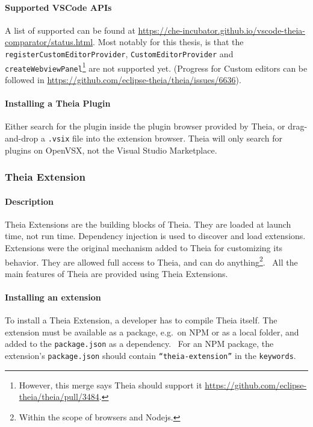 \paragraph*{Supported VSCode APIs}
A list of supported  can be found at \href{https://che-incubator.github.io/vscode-theia-comparator/status.html}{https://che-incubator.github.io/vscode-theia-comparator/status.html}.
Most notably for this thesis, is that the \texttt{registerCustomEditorProvider}, \texttt{CustomEditorProvider} and \texttt{createWebviewPanel}\footnote{However, this merge says Theia should support it \href{https://github.com/eclipse-theia/theia/pull/3484}{https://github.com/eclipse-theia/theia/pull/3484}.} are not supported yet.
(Progress for Custom editors can be followed in \href{https://github.com/eclipse-theia/theia/issues/6636}{https://github.com/eclipse-theia/theia/issues/6636}).

\paragraph*{Installing a Theia Plugin}
Either search for the plugin inside the plugin browser provided by \gls{Theia},
or drag-and-drop a \texttt{.vsix} file into the extension browser.
Theia will only search for plugins on OpenVSX, not the Visual Studio Marketplace.



\subsubsection{Theia Extension}

\paragraph*{Description}
\Gls{Theia} Extensions are the building blocks of Theia.
They are loaded at launch time, not run time.
Dependency injection is used to discover and load extensions.
Extensions were the original mechanism added to Theia for customizing its behavior.
They are allowed full access to Theia, and can do anything\footnote{Within the scope of browsers and \gls{Nodejs}.}.~\cite{helmingEclipseTheiaExtensions2019,helmingEclipseTheiaIDE2019a}
All the main features of Theia are provided using Theia Extensions.

\paragraph*{Installing an extension}
To install a Theia Extension, a developer has to compile Theia itself.
The extension must be available as a package, e.g.\ on \gls{NPM} or as a local folder, and added to the \texttt{package.json} as a dependency.~\cite{helmingHowAddExtensions2019}
For an \gls{NPM} package, the extension's \texttt{package.json} should contain \texttt{``theia-extension''} in the \texttt{keywords}.~\cite{typefoxAuthoringTheiaExtensions}


